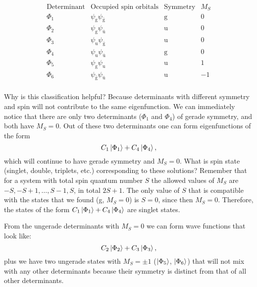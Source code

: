 \documentclass[../Main/chem532-notes.tex]{subfiles}
\begin{document}
\begin{equation}
   \begin{array}{c|ccc}
    \text{Determinant} & \text{Occupied spin orbitals} & \text{Symmetry} & M_S \\
    \hline
    \Phi_1 & \psi_{\mathrm{g}}\psi_{\bar{\mathrm{g}}}  &\mathrm{g} & 0 \\
    \Phi_2 & \psi_{\mathrm{g}}\psi_{\bar{\mathrm{u}}}  &\mathrm{u} & 0 \\
    \Phi_3 & \psi_{\mathrm{u}}\psi_{\bar{\mathrm{g}}}  &\mathrm{u} & 0 \\    
    \Phi_4 & \psi_{\mathrm{u}}\psi_{\bar{\mathrm{u}}}  &\mathrm{g} & 0 \\        
    \Phi_5 & \psi_{\mathrm{g}}\psi_{\mathrm{u}}  &\mathrm{u} & 1 \\
    \Phi_6 & \psi_{\bar{\mathrm{g}}}\psi_{\bar{\mathrm{u}}}  &\mathrm{u} & -1 \\
   \end{array}
\end{equation}

Why is this classification helpful? Because determinants with different symmetry and spin will not contribute to the same eigenfunction.
We can immediately notice that there are only two determinants ($\Phi_1$ and $\Phi_4$) of gerade symmetry, and both have $M_S = 0$. Out of these two determinants one can form eigenfunctions of the form
\begin{equation}
C_1 \ket{\Phi_1} + C_4 \ket{\Phi_4},
\end{equation}
which will continue to have gerade symmetry and $M_S = 0$.
What is spin state (singlet, double, triplets, etc.) corresponding to these solutions?
Remember that for a system with total spin quantum number $S$ the allowed values of $M_S$ are $-S, -S + 1, \ldots, S - 1, S$, in total $2S + 1$.
The only value of $S$ that is compatible with the states that we found (g, $M_S = 0$) is $S = 0$, since then $M_S = 0$.
Therefore, the states of the form $C_1 \ket{\Phi_1} + C_4 \ket{\Phi_4}$ are singlet states.

From the ungerade determinants with $M_S = 0$ we can form wave functions that look like:
\begin{equation}
C_2 \ket{\Phi_2} + C_3 \ket{\Phi_3},
\end{equation}
plus we have two ungerade states with $M_S = \pm1$ ($\ket{\Phi_5}$, $\ket{\Phi_6}$) that will not mix with any other determinants because their symmetry is distinct from that of all other determinants.
\end{document}
